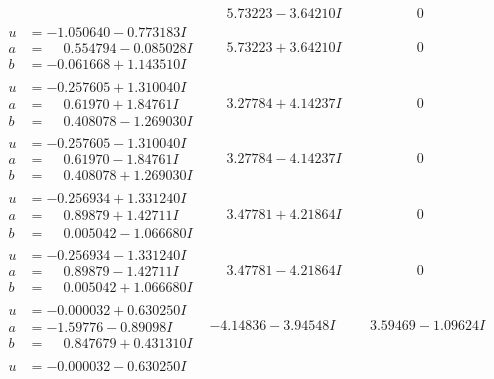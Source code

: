 \documentclass[1p]{elsarticle_modified}
\theoremstyle{definition}
\begin{document}
$$\begin{array}{c|c|c}
 & \phantom{-}5.73223 - 3.64210 I & \phantom{-0.000000 } 0 \\ \hline\begin{aligned}
u &= -1.050640 - 0.773183 I \\
a &= \phantom{-}0.554794 - 0.085028 I \\
b &= -0.061668 + 1.143510 I\end{aligned}
 & \phantom{-}5.73223 + 3.64210 I & \phantom{-0.000000 } 0 \\ \hline\begin{aligned}
u &= -0.257605 + 1.310040 I \\
a &= \phantom{-}0.61970 + 1.84761 I \\
b &= \phantom{-}0.408078 - 1.269030 I\end{aligned}
 & \phantom{-}3.27784 + 4.14237 I & \phantom{-0.000000 } 0 \\ \hline\begin{aligned}
u &= -0.257605 - 1.310040 I \\
a &= \phantom{-}0.61970 - 1.84761 I \\
b &= \phantom{-}0.408078 + 1.269030 I\end{aligned}
 & \phantom{-}3.27784 - 4.14237 I & \phantom{-0.000000 } 0 \\ \hline\begin{aligned}
u &= -0.256934 + 1.331240 I \\
a &= \phantom{-}0.89879 + 1.42711 I \\
b &= \phantom{-}0.005042 - 1.066680 I\end{aligned}
 & \phantom{-}3.47781 + 4.21864 I & \phantom{-0.000000 } 0 \\ \hline\begin{aligned}
u &= -0.256934 - 1.331240 I \\
a &= \phantom{-}0.89879 - 1.42711 I \\
b &= \phantom{-}0.005042 + 1.066680 I\end{aligned}
 & \phantom{-}3.47781 - 4.21864 I & \phantom{-0.000000 } 0 \\ \hline\begin{aligned}
u &= -0.000032 + 0.630250 I \\
a &= -1.59776 - 0.89098 I \\
b &= \phantom{-}0.847679 + 0.431310 I\end{aligned}
 & -4.14836 - 3.94548 I & \phantom{-}3.59469 - 1.09624 I \\ \hline\begin{aligned}
u &= -0.000032 - 0.630250 I \\

\end{aligned}
\end{array}$$
\end{document}
